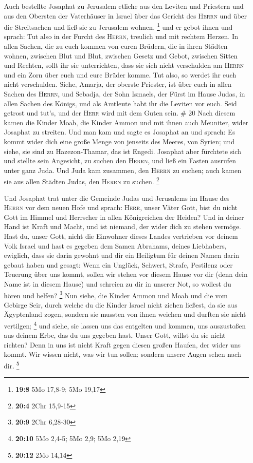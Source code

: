  Auch bestellte Josaphat zu Jerusalem etliche aus den
Leviten und Priestern und aus den Obersten der Vaterhäuser in Israel
über das Gericht des \textsc{Herrn} und über die Streitsachen und ließ
sie zu Jerusalem wohnen, \footnote{\textbf{19:8} 5Mo 17,8-9; 5Mo 19,17}
 und er gebot ihnen und sprach: Tut also in der Furcht des
\textsc{Herrn}, treulich und mit rechtem Herzen.  In
allen Sachen, die zu euch kommen von euren Brüdern, die in ihren Städten
wohnen, zwischen Blut und Blut, zwischen Gesetz und Gebot, zwischen
Sitten und Rechten, sollt ihr sie unterrichten, dass sie sich nicht
verschulden am \textsc{Herrn} und ein Zorn über euch und eure Brüder
komme. Tut also, so werdet ihr euch nicht verschulden. 
Siehe, Amarja, der oberste Priester, ist über euch in allen Sachen des
\textsc{Herrn}, und Sebadja, der Sohn Ismaels, der Fürst im Hause Judas,
in allen Sachen des Königs, und als Amtleute habt ihr die Leviten vor
euch. Seid getrost und tut's, und der \textsc{Herr} wird mit dem Guten
sein. \# 20  Nach diesem kamen die Kinder Moab, die Kinder
Ammon und mit ihnen auch Meuniter, wider Josaphat zu streiten.
 Und man kam und sagte es Josaphat an und sprach: Es kommt
wider dich eine große Menge von jenseits des Meeres, von Syrien; und
siehe, sie sind zu Hazezon-Thamar, das ist Engedi. 
Josaphat aber fürchtete sich und stellte sein Angesicht, zu suchen den
\textsc{Herrn}, und ließ ein Fasten ausrufen unter ganz Juda.
 Und Juda kam zusammen, den \textsc{Herrn} zu suchen; auch
kamen sie aus allen Städten Judas, den \textsc{Herrn} zu suchen.
\footnote{\textbf{20:4} 2Chr 15,9-15}

 Und Josaphat trat unter die Gemeinde Judas und Jerusalems
im Hause des \textsc{Herrn} vor dem neuen Hofe  und
sprach: \textsc{Herr}, unser Väter Gott, bist du nicht Gott im Himmel
und Herrscher in allen Königreichen der Heiden? Und in deiner Hand ist
Kraft und Macht, und ist niemand, der wider dich zu stehen vermöge.
 Hast du, unser Gott, nicht die Einwohner dieses Landes
vertrieben vor deinem Volk Israel und hast es gegeben dem Samen
Abrahams, deines Liebhabers, ewiglich,  dass sie darin
gewohnt und dir ein Heiligtum für deinen Namen darin gebaut haben und
gesagt:  Wenn ein Unglück, Schwert, Strafe, Pestilenz oder
Teuerung über uns kommt, sollen wir stehen vor diesem Hause vor dir
(denn dein Name ist in diesem Hause) und schreien zu dir in unserer Not,
so wollest du hören und helfen? \footnote{\textbf{20:9} 2Chr 6,28-30}
 Nun siehe, die Kinder Ammon und Moab und die vom Gebirge
Seir, durch welche du die Kinder Israel nicht ziehen ließest, da sie aus
Ägyptenland zogen, sondern sie mussten von ihnen weichen und durften sie
nicht vertilgen; \footnote{\textbf{20:10} 5Mo 2,4-5; 5Mo 2,9; 5Mo 2,19}
 und siehe, sie lassen uns das entgelten und kommen, uns
auszustoßen aus deinem Erbe, das du uns gegeben hast. 
Unser Gott, willst du sie nicht richten? Denn in uns ist nicht Kraft
gegen diesen großen Haufen, der wider uns kommt. Wir wissen nicht, was
wir tun sollen; sondern unsere Augen sehen nach dir. \footnote{\textbf{20:12}
  2Mo 14,14}

